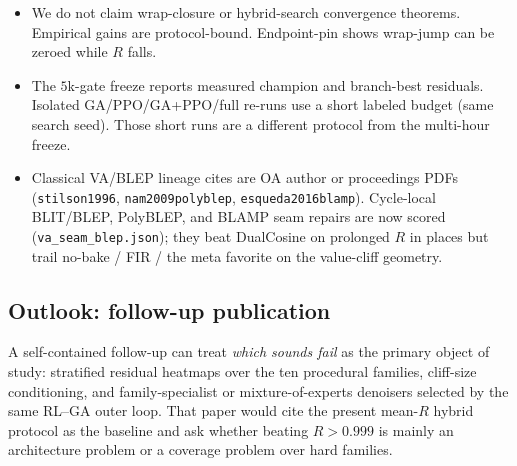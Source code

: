 \begin{itemize}
  \item We do not claim wrap-closure or hybrid-search convergence theorems. Empirical gains are protocol-bound. Endpoint-pin shows wrap-jump can be zeroed while $R$ falls.
  \item The $5$k-gate freeze reports measured champion and branch-best residuals. Isolated GA/PPO/GA{+}PPO/full re-runs use a short labeled budget (same search seed). Those short runs are a different protocol from the multi-hour freeze.
  \item Classical VA/BLEP lineage cites are OA author or proceedings PDFs (\texttt{stilson1996}, \texttt{nam2009polyblep}, \texttt{esqueda2016blamp}). Cycle-local BLIT/BLEP, PolyBLEP, and BLAMP seam repairs are now scored (\texttt{va\_seam\_blep.json}); they beat DualCosine on prolonged $R$ in places but trail no-bake / FIR / the meta favorite on the value-cliff geometry.
\end{itemize}

\subsection{Outlook: follow-up publication}
\label{sec:outlook}

A self-contained follow-up can treat \emph{which sounds fail} as the primary object of study: stratified residual heatmaps over the ten procedural families, cliff-size conditioning, and family-specialist or mixture-of-experts denoisers selected by the same RL--GA outer loop.
That paper would cite the present mean-$R$ hybrid protocol as the baseline and ask whether beating $R>0.999$ is mainly an architecture problem or a coverage problem over hard families.
